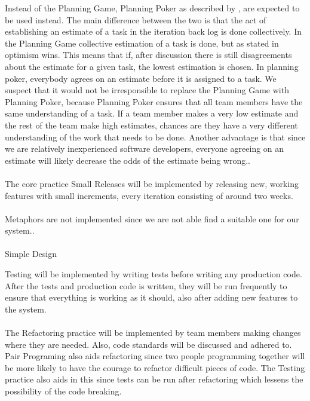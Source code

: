 Instead of the Planning Game, Planning Poker as described by \citep{xp:planningPoker} , are expected to be used instead. The main difference between the two is that the act of establishing an estimate of a task in the iteration back log is done collectively. In the Planning Game collective estimation of a task is done, but as stated in \citep[p. 58]{xp:planning} optimism wins. This means that if, after discussion there is still disagreements about the estimate for a given task, the lowest estimation is chosen. In planning poker, everybody agrees on an estimate before it is assigned to a task. We suspect that it would not be irresponsible to replace the Planning Game with Planning Poker, because Planning Poker ensures that all team members have the same understanding of a task. If a team member makes a very low estimate and the rest of the team make high estimates, chances are they have a very different understanding of the work that needs to be done. Another advantage is that since we are relatively inexperienced software developers, everyone agreeing on an estimate will likely decrease the odds of the estimate being wrong..\\\\

The core practice Small Releases will be implemented by releasing new, working features with small increments, every iteration consisting of around two weeks.\\\\

Metaphors are not implemented since we are not able find a suitable one for our system..\\\\

Simple Design

Testing will be implemented by writing tests before writing any production code. After the tests and production code is written, they will be run frequently to ensure that everything is working as it should, also after adding new features to the system.\\\\

The Refactoring practice will be implemented by team members making changes where they are needed. Also, code standards will be discussed and adhered to. Pair Programing also aids refactoring since two people programming together will be more likely to have the courage to refactor difficult pieces of code. The Testing practice also aids in this since tests can be run after refactoring which lessens the possibility of the code breaking.\\\\


